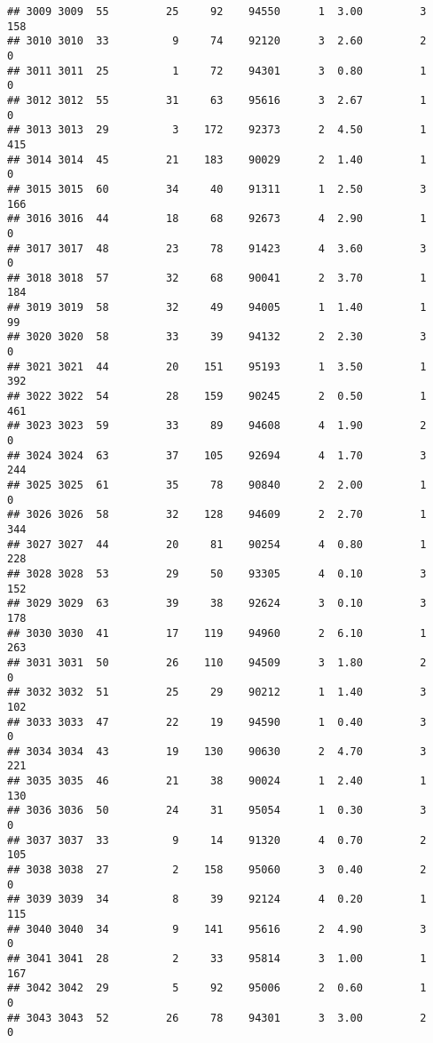 \documentclass[
]{article}
\begin{document}
\begin{verbatim}
## 3009 3009  55         25     92    94550      1  3.00         3      158
## 3010 3010  33          9     74    92120      3  2.60         2        0
## 3011 3011  25          1     72    94301      3  0.80         1        0
## 3012 3012  55         31     63    95616      3  2.67         1        0
## 3013 3013  29          3    172    92373      2  4.50         1      415
## 3014 3014  45         21    183    90029      2  1.40         1        0
## 3015 3015  60         34     40    91311      1  2.50         3      166
## 3016 3016  44         18     68    92673      4  2.90         1        0
## 3017 3017  48         23     78    91423      4  3.60         3        0
## 3018 3018  57         32     68    90041      2  3.70         1      184
## 3019 3019  58         32     49    94005      1  1.40         1       99
## 3020 3020  58         33     39    94132      2  2.30         3        0
## 3021 3021  44         20    151    95193      1  3.50         1      392
## 3022 3022  54         28    159    90245      2  0.50         1      461
## 3023 3023  59         33     89    94608      4  1.90         2        0
## 3024 3024  63         37    105    92694      4  1.70         3      244
## 3025 3025  61         35     78    90840      2  2.00         1        0
## 3026 3026  58         32    128    94609      2  2.70         1      344
## 3027 3027  44         20     81    90254      4  0.80         1      228
## 3028 3028  53         29     50    93305      4  0.10         3      152
## 3029 3029  63         39     38    92624      3  0.10         3      178
## 3030 3030  41         17    119    94960      2  6.10         1      263
## 3031 3031  50         26    110    94509      3  1.80         2        0
## 3032 3032  51         25     29    90212      1  1.40         3      102
## 3033 3033  47         22     19    94590      1  0.40         3        0
## 3034 3034  43         19    130    90630      2  4.70         3      221
## 3035 3035  46         21     38    90024      1  2.40         1      130
## 3036 3036  50         24     31    95054      1  0.30         3        0
## 3037 3037  33          9     14    91320      4  0.70         2      105
## 3038 3038  27          2    158    95060      3  0.40         2        0
## 3039 3039  34          8     39    92124      4  0.20         1      115
## 3040 3040  34          9    141    95616      2  4.90         3        0
## 3041 3041  28          2     33    95814      3  1.00         1      167
## 3042 3042  29          5     92    95006      2  0.60         1        0
## 3043 3043  52         26     78    94301      3  3.00         2        0

\end{verbatim}
\end{document}
